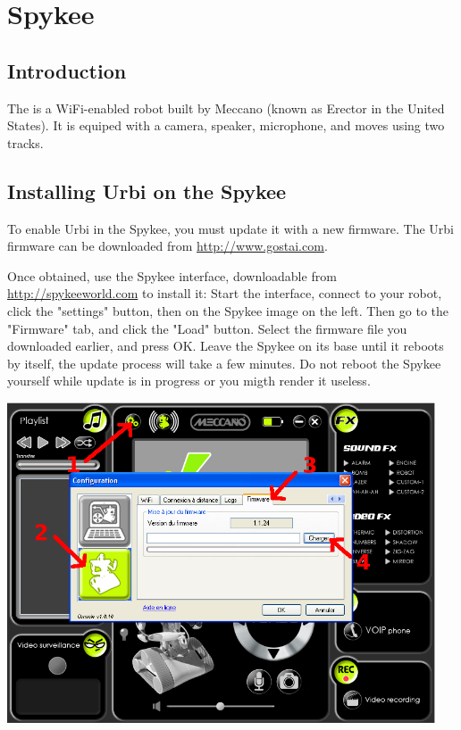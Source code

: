 \chapter{Spykee}
\label{sec:spykee}

\section{Introduction}

The  is a WiFi-enabled robot built by Meccano (known as
Erector in the United States). It is equiped with a camera, speaker,
microphone, and moves using two tracks.

\section{Installing Urbi on the Spykee}

To enable Urbi in the Spykee, you must update it with a new firmware. The Urbi
firmware can be downloaded from \url{http://www.gostai.com}.

Once obtained, use the Spykee interface, downloadable from
\url{http://spykeeworld.com} to install it: Start the interface, connect to
your robot, click the "settings" button, then on the Spykee image on the left.
Then go to the "Firmware" tab, and click the "Load" button. Select the firmware
file you downloaded earlier, and press OK. Leave the Spykee on its base until it
reboots by itself, the update process will take a few minutes. Do not reboot
the Spykee yourself while update is in progress or you migth render it useless.
\begin{center}
\includegraphics[width=0.95\textwidth]{img/spykee-flash-instructions}
\end{center}


